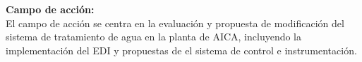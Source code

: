 \textbf{Campo de acción:}\\
El campo de acción se centra en la evaluación y propuesta de
modificación del sistema de tratamiento de agua en la planta de
AICA, incluyendo la implementación del EDI y propuestas
de el sistema de control e instrumentación.